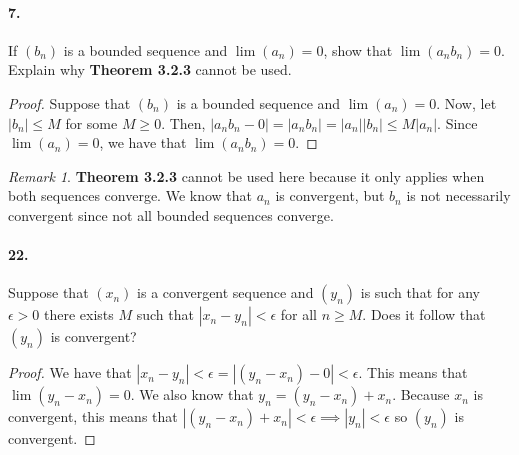 \documentclass[12pt]{article}
\theoremstyle{remark}
\newtheorem*{remark}{Remark}
\begin{document}
\paragraph{7.} If $(b_n)$ is a bounded sequence and $\lim(a_n) = 0$, show that $\lim(a_n b_n) = 0$. Explain why \textbf{Theorem 3.2.3} cannot be used. 
\begin{proof}
    Suppose that $(b_n)$ is a bounded sequence and $\lim(a_n) = 0$. Now, let $|b_n| \leq M$ for some $M \geq 0$. Then, $|a_n b_n - 0| = |a_n b_n| = |a_n| |b_n| \leq M |a_n|$. Since $\lim(a_n) = 0$, we have that $\lim(a_n b_n) = 0$.
\end{proof}
\begin{remark}
    \textbf{Theorem 3.2.3} cannot be used here because it only applies when both sequences converge. We know that $a_n$ is convergent, but $b_n$ is not necessarily convergent since not all bounded sequences converge.
\end{remark}

\paragraph{22.} Suppose that $(x_n)$ is a convergent sequence and $(y_n)$ is such that for any $\epsilon > 0$ there exists $M$ such that $|x_n - y_n| < \epsilon$ for all $n \geq M$. Does it follow that $(y_n)$ is convergent?
\begin{proof}
    We have that $|x_n - y_n| < \epsilon = |(y_n - x_n) - 0| < \epsilon$. This means that $\lim(y_n - x_n) = 0$. We also know that $y_n = (y_n - x_n) + x_n$. Because $x_n$ is convergent, this means that $|(y_n - x_n) + x_n| < \epsilon \implies |y_n| < \epsilon$ so $(y_n)$ is convergent.
\end{proof}
\end{document}
